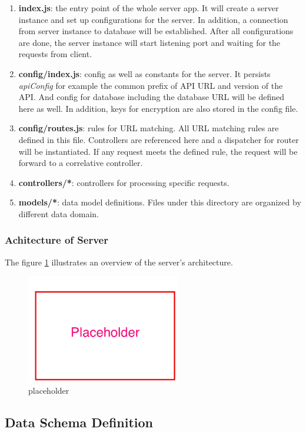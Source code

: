 \begin{enumerate}
\item 
  \textbf{index.js}: the entry point of the whole server app. It will create a server instance and set up configurations for the server. In addition, a connection from server instance to database will be established. After all configurations are done, the server instance will start listening port and waiting for the requests from client.
\item
  \textbf{config/index.js}: config as well as constants for the server. It persists \textit{apiConfig} for example the common prefix of API URL and version of the API. And config for database including the database URL will be defined here as well. In addition, keys for encryption are also stored in the config file.
\item
  \textbf{config/routes.js}: rules for URL matching. All URL matching rules are defined in this file. Controllers are referenced here and a dispatcher for router will be instantiated. If any request meets the defined rule, the request will be forward to a correlative controller. 
\item
  \textbf{controllers/*}: controllers for processing specific requests.
\item 
  \textbf{models/*}: data model definitions. Files under this directory are organized by different data domain.
\end{enumerate}


\subsubsection{Achitecture of Server}

The figure \ref{fig:server-arch-imp} illustrates an overview of the server's architecture. 

\begin{figure}[!htbp]
  \centering
    \includegraphics[width=0.6\textwidth]{Figures/placeholder.png}
  \caption{placeholder}
  \label{fig:server-arch-imp}
\end{figure}

\subsection{Data Schema Definition}